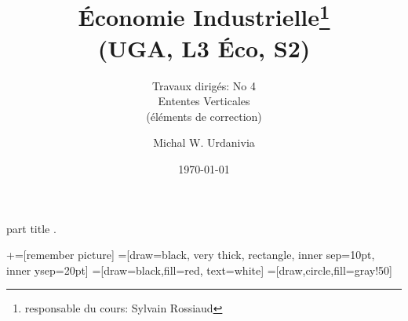 
\usepackage{color}
\usepackage{tikz}
\usetikzlibrary{shapes.geometric, arrows}
\usepackage{enumerate}   
\usepackage{multirow}
%
  \usepackage{eso-pic}

{
    \begin{centering}
    \begin{beamercolorbox}[sep=11pt,center]{part title}
    \thesection.~\insertsection\par
    \end{beamercolorbox}
    \end{centering}
}
\title[]{ \textbf{Économie Industrielle}\footnote{responsable du cours: Sylvain Rossiaud} \\ (UGA, L3 Éco, S2) \\ }
\subtitle{Travaux dirigés: No 4\\ Ententes Verticales\\
(éléments de correction)}
\date{\today}
\author{Michal W. Urdanivia\inst{*}}




\usetikzlibrary{positioning}
\usetikzlibrary{snakes}
\usetikzlibrary{calc}
\usetikzlibrary{arrows}
\usetikzlibrary{decorations.markings}
\usetikzlibrary{shapes.misc}
\usetikzlibrary{matrix,shapes,arrows,fit,tikzmark}
\usetikzlibrary{shapes}
\usetikzlibrary{shapes.geometric, arrows}
\newcommand\marktopleft[1]{
    \tikz[overlay,remember picture] 
        \node (marker-#1-a) at (-.3em,.3em) {};%
}
\newcommand\markbottomright[2]{%
    \tikz[overlay,remember picture] 
        \node (marker-#1-b) at (0em,0em) {};%
}
+=[remember picture] 
 =[draw=black, very thick, rectangle, inner sep=10pt, inner ysep=20pt]
 =[draw=black,fill=red, text=white]
=[draw,circle,fill=gray!50]

